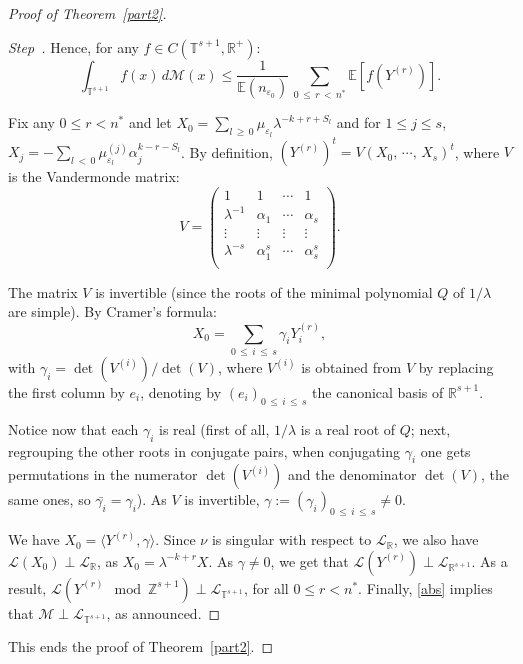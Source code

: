 \documentclass[AHL,Unicode,longabstracts,published]{cedram}
\newcommand{\Ebb}{\mathbb E}
\newcommand{\Tbb}{\mathbb T}
\newcommand{\Rbb}{\mathbb R}
\newcommand{\Zbb}{\mathbb Z}
\newcommand{\Lcl}{\mathcal{L}}
\newcommand{\Mcl}{\mathcal{M}}
\newcounter{stepcount}
\newenvironment{step}{\refstepcounter{stepcount}\begin{proof}[Step~\thestepcount]}{\let\qed\relax\end{proof}}
\begin{document}
\begin{proof}[{Proof of Theorem~\ref{part2}}]
\begin{step}
Hence, for any $f\in C(\Tbb^{s+1},\Rbb^+)$:
\begin{equation}\label{abs}
\int_{\Tbb^{s+1}}f(x)\,d{\Mcl}(x)\leq\frac{1}{\Ebb(n_{\varepsilon_0})}\,\sum_{0\,\leq\,r\,<\,n^*}\Ebb\left[{f\left(Y^{(r)}\right)}\right].
\end{equation}


Fix any $0\leq r<n^*$ and let $X_0=\sum_{l\,\geq\,0}\mu_{\varepsilon_l}\lambda^{-k+r+S_l}$ and for $1\leq j\leq s$, $X_j=-\sum_{l\,<\,0}\mu^{(j)}_{\varepsilon_l}\alpha_j^{k-r-S_l}$. By definition, $(Y^{(r)})^t=V(X_0,\,\cdots,\,X_s)^t$, where $V$ is the Vandermonde matrix:
\[
V=\left(
\begin{matrix}
1&1&\cdots&1\\
\lambda^{-1}&\alpha_1&\cdots&\alpha_s\\
\vdots&\vdots&\vdots&\vdots\\
\lambda^{-s}&\alpha_1^s&\cdots&\alpha_s^s\\
\end{matrix}\right).
\]



The matrix $V$ is invertible (since the roots of the minimal polynomial $Q$ of $1/\lambda$ are simple). By Cramer's formula:
\[
X_0=\sum_{0\,\leq\,i\,\leq\,s}\gamma_iY_i^{(r)},
\]
with $\gamma_i=\det(V^{(i)})/\det(V)$, where $V^{(i)}$ is obtained from $V$ by replacing the first column by $e_i$, denoting by $(e_i)_{0\,\leq\, i\,\leq\,s}$ the canonical basis of $\Rbb^{s+1}$.


Notice now that each $\gamma_i$ is real (first of all, $1/\lambda$ is a real root of $Q$; next, regrouping the other roots in conjugate pairs, when conjugating $\gamma_i$ one gets permutations in the numerator $\det(V^{(i)})$ and the denominator $\det(V)$, the same ones, so $\bar{\gamma_i}=\gamma_i$). As $V$ is invertible, $\gamma:=(\gamma_i)_{0\,\leq\,i\,\leq\,s}\not=0$.




 We have $X_0=\langle Y^{(r)},\gamma\rangle$. Since $\nu$ is singular with respect to ${\Lcl}_{\Rbb}$, we also have ${\Lcl}(X_0)\perp {\Lcl}_{\Rbb}$, as $X_0=\lambda^{-k+r}X$. As $\gamma\not=0$, we get that ${\Lcl}(Y^{(r)})\perp {\Lcl}_{\Rbb^{s+1}}$. As a result, ${\Lcl}(Y^{(r)}\mod\Zbb^{s+1})\perp {\Lcl}_{\Tbb^{s+1}}$, for all $0\leq r<n^*$. Finally, \eqref{abs} implies that ${\Mcl}\perp {\Lcl}_{\Tbb^{s+1}}$, as announced.
\end{step}

This ends the proof of Theorem~\ref{part2}.
\end{proof}
\end{document}
